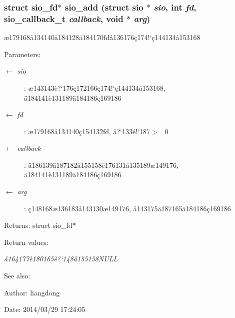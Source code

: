 \subsubsection{\setlength{\rightskip}{0pt plus 5cm}struct sio\_\-fd$\ast$ sio\_\-add (struct sio $\ast$ {\em sio}, int {\em fd}, sio\_\-callback\_\-t {\em callback}, void $\ast$ {\em arg})}\label{sio_8c_a3}


\ae{}179168\aa{}134140\"{a}184128\"{a}184170fd\aa{}136176\c{c}174!`\c{c}144134\aa{}153168 

\begin{Desc}
\item[Parameters:]
\begin{description}
\item[\mbox{$\leftarrow$} {\em sio}]: \ae{}143143\`{e}?`176\c{c}172166\c{c}174!`\c{c}144134\aa{}153168, \"{a}184141\`{e}131189\"{a}184186\c{c}169186 \item[\mbox{$\leftarrow$} {\em fd}]: \ae{}179168\aa{}134140\c{c}154132fd, \aa{}?`133\'{e}!`187$>$=0 \item[\mbox{$\leftarrow$} {\em callback}]: \"{a}186139\"{a}187182\aa{}155158\`{e}176131\aa{}135189\ae{}149176, \"{a}184141\`{e}131189\"{a}184186\c{c}169186 \item[\mbox{$\leftarrow$} {\em arg}]: \c{c}148168\ae{}136183\aa{}143130\ae{}149176, \aa{}143175\"{a}187165\"{a}184186\c{c}169186 \end{description}
\end{Desc}
\begin{Desc}
\item[Returns:]struct sio\_\-fd$\ast$ \end{Desc}
\begin{Desc}
\item[Return values:]
\begin{description}
\item[{\em \aa{}164177\`{e}180165\`{e}?`148\aa{}155158NULL}]\end{description}
\end{Desc}
\begin{Desc}
\item[See also:]\end{Desc}
\begin{Desc}
\item[Author:]liangdong \end{Desc}
\begin{Desc}
\item[Date:]2014/03/29 17:24:05 \end{Desc}
